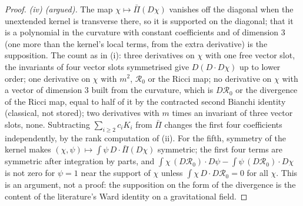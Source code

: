 \begin{proof}
\emph{(iv) (argued).} The map $\chi \mapsto \bar\Pi(D\chi)$ vanishes off the diagonal when the unextended kernel is transverse there, so it is supported on the diagonal; that it is a polynomial in the curvature with constant coefficients and of dimension $3$ (one more than the kernel's local terms, from the extra derivative) is the supposition. The count as in (i): three derivatives on $\chi$ with one free vector slot, the invariants of four vector slots symmetrised give $D(D\cdot D\chi)$ up to lower order; one derivative on $\chi$ with $m^{2}$, $\mathcal{R}_{0}$ or the Ricci map; no derivative on $\chi$ with a vector of dimension $3$ built from the curvature, which is $D\mathcal{R}_{0}$ or the divergence of the Ricci map, equal to half of it by the contracted second Bianchi identity (classical, not stored); two derivatives with $m$ times an invariant of three vector slots, none. Subtracting $\sum_{i\geq 2}c_{i}K_{i}$ from $\bar\Pi$ changes the first four coefficients independently, by the rank computation of (ii). For the fifth, symmetry of the kernel makes $(\chi, \psi) \mapsto \int\psi\,D\cdot\bar\Pi(D\chi)$ symmetric; the first four terms are symmetric after integration by parts, and $\int\chi\,(D\mathcal{R}_{0})\cdot D\psi - \int\psi\,(D\mathcal{R}_{0})\cdot D\chi$ is not zero for $\psi = 1$ near the support of $\chi$ unless $\int\chi\,D\cdot D\mathcal{R}_{0} = 0$ for all $\chi$. This is an argument, not a proof: the supposition on the form of the divergence is the content of the literature's Ward identity on a gravitational field.
\end{proof}
